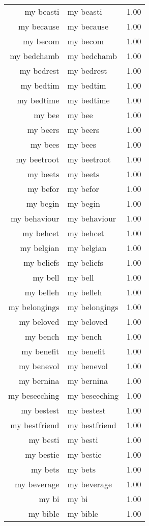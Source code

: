 \begin{table}[ht]
\begin{tabular}{rlr}
  my beasti & my beasti & 1.00 \\ 
  my because & my because & 1.00 \\ 
  my becom & my becom & 1.00 \\ 
  my bedchamb & my bedchamb & 1.00 \\ 
  my bedrest & my bedrest & 1.00 \\ 
  my bedtim & my bedtim & 1.00 \\ 
  my bedtime & my bedtime & 1.00 \\ 
  my bee & my bee & 1.00 \\ 
  my beers & my beers & 1.00 \\ 
  my bees & my bees & 1.00 \\ 
  my beetroot & my beetroot & 1.00 \\ 
  my beets & my beets & 1.00 \\ 
  my befor & my befor & 1.00 \\ 
  my begin & my begin & 1.00 \\ 
  my behaviour & my behaviour & 1.00 \\ 
  my behcet & my behcet & 1.00 \\ 
  my belgian & my belgian & 1.00 \\ 
  my beliefs & my beliefs & 1.00 \\ 
  my bell & my bell & 1.00 \\ 
  my belleh & my belleh & 1.00 \\ 
  my belongings & my belongings & 1.00 \\ 
  my beloved & my beloved & 1.00 \\ 
  my bench & my bench & 1.00 \\ 
  my benefit & my benefit & 1.00 \\ 
  my benevol & my benevol & 1.00 \\ 
  my bernina & my bernina & 1.00 \\ 
  my beseeching & my beseeching & 1.00 \\ 
  my bestest & my bestest & 1.00 \\ 
  my bestfriend & my bestfriend & 1.00 \\ 
  my besti & my besti & 1.00 \\ 
  my bestie & my bestie & 1.00 \\ 
  my bets & my bets & 1.00 \\ 
  my beverage & my beverage & 1.00 \\ 
  my bi & my bi & 1.00 \\ 
  my bible & my bible & 1.00 \\ 

\end{tabular}
\end{table}
